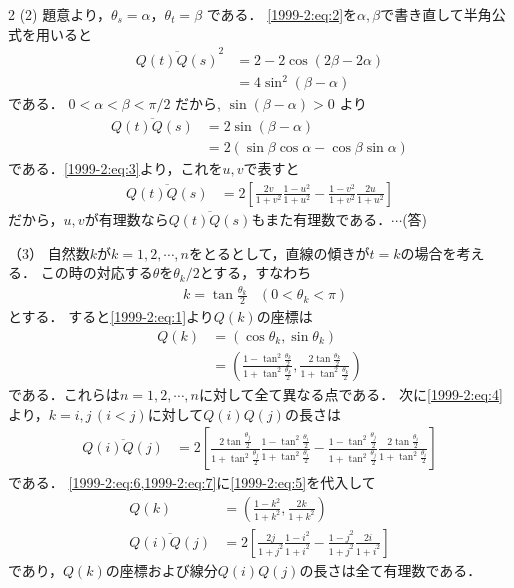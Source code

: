 \documentclass[../../../../main.tex]{subfiles}
\begin{document}
\begin{multicols}{2}
  (2)
  題意より，$\theta_{s} = \alpha$，$\theta_{t} = \beta$ である．
  \cref{1999-2:eq:2}を$\alpha,\beta$で書き直して半角公式を用いると
  \begin{align*}
    \overline{Q(t)Q(s)}^2
     & = 2 - 2 \cos (2\beta - 2\alpha) \\
     & = 4\sin^2(\beta-\alpha)
  \end{align*}
  である．
  $0 < \alpha < \beta < \pi/2$ だから, $\sin(\beta-\alpha)>0$ より
  \begin{align*}
    \overline{Q(t)Q(s)}
     & = 2\sin(\beta-\alpha)                          \\
     & = 2(\sin\beta\cos\alpha - \cos\beta\sin\alpha)
  \end{align*}
  である．\cref{1999-2:eq:3}より，これを$u,v$で表すと
  \begin{align}
    \overline{Q(t)Q(s)}
     & = 2\left[\frac{2v}{1+v^2}\frac{1-u^2}{1+u^2} - \frac{1-v^2}{1+v^2}\frac{2u}{1+u^2}\right] \label{1999-2:eq:4}
  \end{align}
  だから，$u,v$が有理数なら$\overline{Q(t)Q(s)}$もまた有理数である．$\cdots$(答)
  \vspace{10pt}

  （3）
  自然数$k$が$k=1,2,\cdots, n$をとるとして，直線の傾きが$t=k$の場合を考える．
  この時の対応する$\theta$を$\theta_{k}/2$とする，すなわち
  \begin{align}
     & k = \tan \frac{\theta_{k}}{2} & \left(0 < \theta_{k} < \pi \right)\label{1999-2:eq:5}
  \end{align}
  とする．
  すると\cref{1999-2:eq:1}より$Q(k)$の座標は
  \begin{align}
    Q(k) & = \left(\cos \theta_{k}, \sin\theta_{k}\right)                                                                                                                       \\
         & = \left(\frac{1-\tan^2\frac{\theta_{k}}{2}}{1+\tan^2\frac{\theta_{k}}{2}}, \frac{2\tan\frac{\theta_{k}}{2}}{1+\tan^2\frac{\theta_{k}}{2}}\right) \label{1999-2:eq:6}
  \end{align}
  である．これらは$n=1,2,\cdots,n$に対して全て異なる点である．
  次に\cref{1999-2:eq:4}より，$k=i,j\, (i<j)$に対して$Q(i)Q(j)$の長さは
  \begin{align}
    \overline{Q(i)Q(j)}
     & = 2\left[\frac{2\tan\frac{\theta_{j}}{2}}{1+\tan^2\frac{\theta_{j}}{2}}\frac{1-\tan^2\frac{\theta_{i}}{2}}{1+ \tan^2\frac{\theta_{i}}{2}} - \frac{1-\tan^2\frac{\theta_{j}}{2}}{1+\tan^2\frac{\theta_{j}}{2}}\frac{2\tan\frac{\theta_{i}}{2}}{1+\tan^2\frac{\theta_{i}}{2}}\right] \label{1999-2:eq:7}
  \end{align}
  である．
  \cref{1999-2:eq:6,1999-2:eq:7}に\cref{1999-2:eq:5}を代入して
  \begin{align*}
    Q(k) & = \left(\frac{1-k^2}{1+k^2}, \frac{2k}{1+k^2}\right)                                      \\
    \overline{Q(i)Q(j)}
         & = 2\left[\frac{2j}{1+j^2}\frac{1-i^2}{1+i^2} - \frac{1-j^2}{1+j^2}\frac{2i}{1+i^2}\right]
  \end{align*}
  であり，$Q(k)$の座標および線分$Q(i)Q(j)$の長さは全て有理数である．


\end{multicols}
\end{document}
